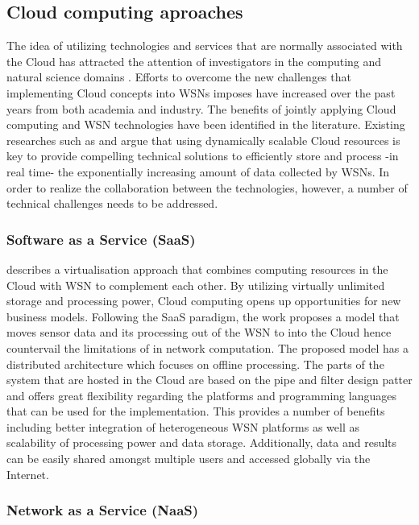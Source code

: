 \subsection{Cloud computing aproaches}
The idea of utilizing technologies and services that are normally associated with the Cloud has attracted the attention of investigators in the computing and natural science domains \cite{Kurschl:2009:CCC:1806338.1806435,ahmed2011integrating,rolim2010cloud}. Efforts to overcome the new challenges that implementing Cloud concepts into WSNs imposes have increased over the past years from both academia and industry. The benefits of jointly applying Cloud computing and WSN technologies have been identified in the literature. Existing researches such as \cite{liu2011opportunities} and \cite{hassan2009framework} argue that using dynamically scalable Cloud resources is key to provide compelling technical solutions to efficiently store and process -in real time- the exponentially increasing amount of data collected by WSNs. In order to realize the collaboration between the technologies, however, a number of technical challenges needs to be addressed.


\subsubsection{Software as a Service (SaaS)}
\cite{Kurschl:2009:CCC:1806338.1806435} describes a virtualisation approach that combines computing resources in the Cloud with WSN to complement each other. By utilizing virtually unlimited storage and processing power, Cloud computing opens up opportunities for new business models.  Following the SaaS paradigm, the work proposes a model that moves sensor data and its processing out of the WSN to into the Cloud hence countervail the limitations of in network computation. The proposed model has a distributed architecture which focuses on offline processing. The parts of the system that are hosted in the Cloud are based on the pipe and filter design patter and offers great flexibility regarding the platforms and programming languages that can be used for the implementation. This provides a number of benefits including
better integration of heterogeneous WSN platforms as well as scalability of processing power and data storage.  Additionally, data and results can be easily shared amongst multiple users and accessed globally via the Internet.

\subsubsection{Network as a Service (NaaS)}

